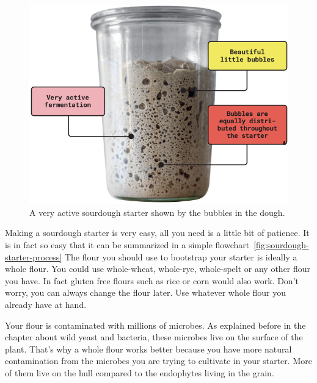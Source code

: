 \begin{figure}[!htb]
  \centering
  \includegraphics[width=\textwidth]{sourdough-starter-activity-indicators}
  \caption[Very active sourdough]{A very active sourdough starter shown by the
      bubbles in the dough.}%
  \label{fig:sourdough-starter}
\end{figure}

Making a sourdough starter is very easy, all you need
is a little bit of patience. It is in fact so easy that it can be summarized
in a simple flowchart~\ref{fig:sourdough-starter-process} The flour you should
use to bootstrap your starter is ideally a whole flour.
You could use whole-wheat, whole-rye, whole-spelt or
any other flour you have. In fact gluten free flours such
as rice or corn would also work. Don't worry, you can always
change the flour later. Use whatever whole flour you
already have at hand.

\begin{flowchart}[!htb]
\centering
  
  \caption[The full sourdough starter process]{The process of making a sourdough
      starter from scratch.}%
  \label{fig:sourdough-starter-process}
\end{flowchart}

Your flour is contaminated with millions of microbes. As explained
before in the chapter about wild yeast and bacteria, these
microbes live on the surface of the plant. That's why
a whole flour works better because you have more natural
contamination from the microbes you are trying to cultivate
in your starter. More of them live on the hull compared to the
endophytes living in the grain.

